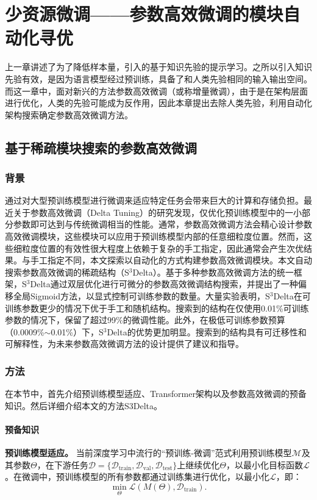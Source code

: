 \chapter{少资源微调——参数高效微调的模块自动化寻优}

上一章讲述了为了降低样本量，引入的基于知识先验的提示学习。之所以引入知识先验有效，是因为语言模型经过预训练，具备了和人类先验相同的输入输出空间。而这一章中，面对新兴的方法参数高效微调（或称增量微调），由于是在架构层面进行优化，人类的先验可能成为反作用，因此本章提出去除人类先验，利用自动化架构搜索确定参数高效微调方法。

\section{基于稀疏模块搜索的参数高效微调}
\subsection{背景}

通过对大型预训练模型进行微调来适应特定任务会带来巨大的计算和存储负担。最近关于参数高效微调（Delta Tuning）的研究发现，仅优化预训练模型中的一小部分参数即可达到与传统微调相当的性能。通常，参数高效微调方法会精心设计参数高效微调模块，这些模块可以应用于预训练模型内部的任意细粒度位置。然而，这些细粒度位置的有效性很大程度上依赖于复杂的手工指定，因此通常会产生次优结果。与手工指定不同，本文探索以自动化的方式构建参数高效微调模块。本文自动搜索参数高效微调的稀疏结构（S$^3$Delta）。基于多种参数高效微调方法的统一框架，S$^3$Delta通过双层优化进行可微分的参数高效微调结构搜索，并提出了一种偏移全局Sigmoid方法，以显式控制可训练参数的数量。大量实验表明，S$^3$Delta在可训练参数更少的情况下优于手工和随机结构。搜索到的结构在仅使用0.01\%可训练参数的情况下，保留了超过99\%的微调性能。此外，在极低可训练参数预算（0.0009\%$\sim$0.01\%）下，S$^3$Delta的优势更加明显。搜索到的结构具有可迁移性和可解释性，为未来参数高效微调方法的设计提供了建议和指导。


\subsection{方法}
在本节中，首先介绍预训练模型适应、Transformer架构以及参数高效微调的预备知识。然后详细介绍本文的方法S3Delta。

\subsubsection{预备知识}
\label{sec:meth:preliminaries}
\textbf{预训练模型适应。} 当前深度学习中流行的“预训练-微调”范式利用预训练模型$\mathcal{M}$及其参数$\Theta$，在下游任务$\mathcal{D}=\{\mathcal{D}_{\text{train}}, \mathcal{D}_{\text{val}}, \mathcal{D}_{\text{test}}\}$上继续优化$\Theta$，以最小化目标函数$\mathcal{L}$。在微调中，预训练模型的所有参数都通过训练集进行优化，以最小化$\mathcal{L}$，即：
\begin{equation}
   \operatorname{min}_\Theta \mathcal{L}(M(\Theta), \mathcal{D}_{\text{train}}).
\end{equation}

